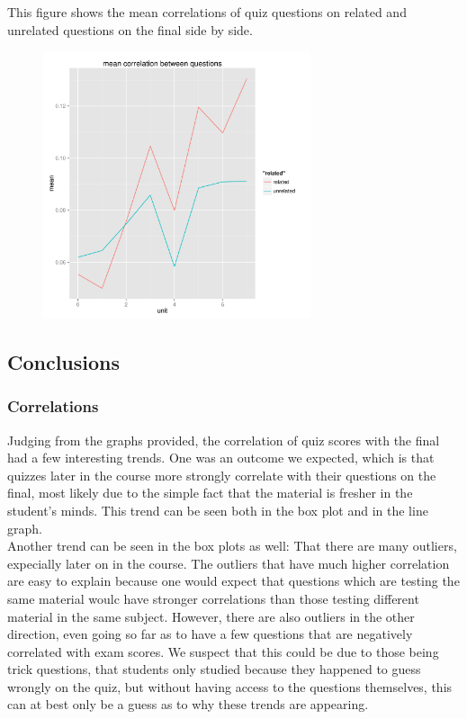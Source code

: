 \documentclass[12pt,a4paper]{article}
\begin{document}
\begin{singlespace}
\newpage

This figure shows the mean correlations of quiz questions on related and unrelated questions on the final side by side.
\begin{figure}[h!]
    \centering
    \includegraphics[width=0.7\textwidth,trim= 0 0 20 30, clip]{correlationlines.pdf}
\end{figure}
\FloatBarrier


\subsection{Conclusions}
\subsubsection{Correlations}
Judging from the graphs provided, the correlation of quiz scores with the final had a few interesting trends. One was an outcome we expected, which is that quizzes later in the course more strongly correlate with their questions on the final, most likely due to the simple fact that the material is fresher in the student's minds. This trend can be seen both in the box plot and in the line graph. \\

Another trend can be seen in the box plots as well: That there are many outliers, expecially later on in the course. The outliers that have much higher correlation are easy to explain because one would expect that questions which are testing the same material woulc have stronger correlations than those testing different material in the same subject. However, there are also outliers in the other direction, even going so far as to have a few questions that are negatively correlated with exam scores. We suspect that this could be due to those being trick questions, that students only studied because they happened to guess wrongly on the quiz, but without having access to the questions themselves, this can at best only be a guess as to why these trends are appearing.

\end{singlespace}
\end{document}
